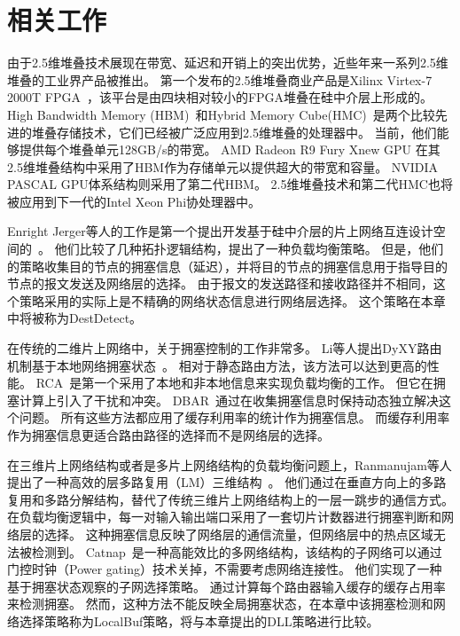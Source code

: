 \section{相关工作}
\label{sec:dllrelated}

由于2.5维堆叠技术展现在带宽、延迟和开销上的突出优势，近些年来一系列2.5维堆叠的工业界产品被推出。
第一个发布的2.5维堆叠商业产品是Xilinx Virtex-7 2000T FPGA~，该平台是由四块相对较小的FPGA堆叠在硅中介层上形成的。
High Bandwidth Memory (HBM)~和Hybrid Memory Cube(HMC)~是两个比较先进的堆叠存储技术，它们已经被广泛应用到2.5维堆叠的处理器中。
当前，他们能够提供每个堆叠单元128GB/s的带宽。
AMD Radeon R9 Fury Xnew GPU 在其2.5维堆叠结构中采用了HBM作为存储单元以提供超大的带宽和容量。
NVIDIA PASCAL GPU体系结构则采用了第二代HBM。
2.5维堆叠技术和第二代HMC也将被应用到下一代的Intel Xeon Phi协处理器中。

Enright Jerger等人的工作是第一个提出开发基于硅中介层的片上网络互连设计空间的~。
他们比较了几种拓扑逻辑结构，提出了一种负载均衡策略。
但是，他们的策略收集目的节点的拥塞信息（延迟），并将目的节点的拥塞信息用于指导目的节点的报文发送及网络层的选择。
由于报文的发送路径和接收路径并不相同，这个策略采用的实际上是不精确的网络状态信息进行网络层选择。
这个策略在本章中将被称为DestDetect。

在传统的二维片上网络中，关于拥塞控制的工作非常多。
Li等人提出DyXY路由机制基于本地网络拥塞状态~。
相对于静态路由方法，该方法可以达到更高的性能。
RCA~是第一个采用了本地和非本地信息来实现负载均衡的工作。
但它在拥塞计算上引入了干扰和冲突。
DBAR~通过在收集拥塞信息时保持动态独立解决这个问题。
所有这些方法都应用了缓存利用率的统计作为拥塞信息。
而缓存利用率作为拥塞信息更适合路由路径的选择而不是网络层的选择。

在三维片上网络结构或者是多片上网络结构的负载均衡问题上，Ranmanujam等人提出了一种高效的层多路复用（LM）三维结构~。
他们通过在垂直方向上的多路复用和多路分解结构，替代了传统三维片上网络结构上的一层一跳步的通信方式。
在负载均衡逻辑中，每一对输入输出端口采用了一套切片计数器进行拥塞判断和网络层的选择。
这种拥塞信息反映了网络层的通信流量，但网络层中的热点区域无法被检测到。
Catnap~是一种高能效比的多网络结构，该结构的子网络可以通过门控时钟（Power gating）技术关掉，不需要考虑网络连接性。
他们实现了一种基于拥塞状态观察的子网选择策略。
通过计算每个路由器输入缓存的缓存占用率来检测拥塞。
然而，这种方法不能反映全局拥塞状态，在本章中该拥塞检测和网络选择策略称为LocalBuf策略，将与本章提出的DLL策略进行比较。


